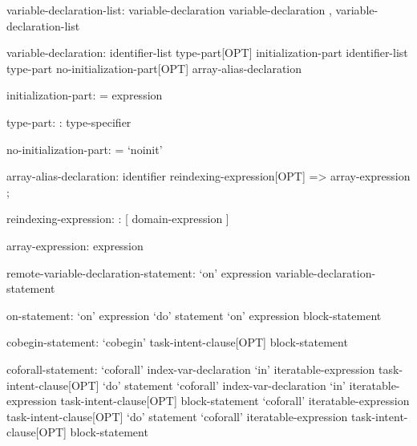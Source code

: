 \begin{syntax}
variable-declaration-list:
  variable-declaration
  variable-declaration , variable-declaration-list
\end{syntax}

\begin{syntax}
variable-declaration:
  identifier-list type-part[OPT] initialization-part
  identifier-list type-part no-initialization-part[OPT]
  array-alias-declaration
\end{syntax}

\begin{syntax}
initialization-part:
  = expression
\end{syntax}

\begin{syntax}
type-part:
  : type-specifier
\end{syntax}

\begin{syntax}
no-initialization-part:
  = `noinit'
\end{syntax}

\begin{syntax}
array-alias-declaration:
  identifier reindexing-expression[OPT] => array-expression ;
\end{syntax}

\begin{syntax}
reindexing-expression:
  : [ domain-expression ]
\end{syntax}

\begin{syntax}
array-expression:
  expression
\end{syntax}

\begin{syntax}
remote-variable-declaration-statement:
  `on' expression variable-declaration-statement
\end{syntax}

\begin{syntax}
on-statement:
  `on' expression `do' statement
  `on' expression block-statement
\end{syntax}

\begin{syntax}
cobegin-statement:
  `cobegin' task-intent-clause[OPT] block-statement
\end{syntax}

\begin{syntax}
coforall-statement:
  `coforall' index-var-declaration `in' iteratable-expression task-intent-clause[OPT] `do' statement
  `coforall' index-var-declaration `in' iteratable-expression task-intent-clause[OPT] block-statement
  `coforall' iteratable-expression task-intent-clause[OPT] `do' statement
  `coforall' iteratable-expression task-intent-clause[OPT] block-statement
\end{syntax}

